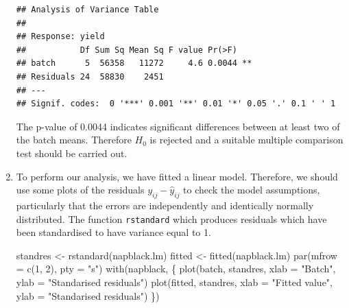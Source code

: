\documentclass[
]{book}
\newenvironment{Shaded}{\begin{snugshade}}{\end{snugshade}}
\newcommand{\AttributeTok}[1]{\textcolor[rgb]{0.77,0.63,0.00}{#1}}
\newcommand{\DecValTok}[1]{\textcolor[rgb]{0.00,0.00,0.81}{#1}}
\newcommand{\FunctionTok}[1]{\textcolor[rgb]{0.00,0.00,0.00}{#1}}
\newcommand{\NormalTok}[1]{#1}
\newcommand{\OtherTok}[1]{\textcolor[rgb]{0.56,0.35,0.01}{#1}}
\newcommand{\SpecialCharTok}[1]{\textcolor[rgb]{0.00,0.00,0.00}{#1}}
\newcommand{\StringTok}[1]{\textcolor[rgb]{0.31,0.60,0.02}{#1}}
\theoremstyle{definition}
\theoremstyle{definition}
\theoremstyle{definition}
\theoremstyle{definition}
\theoremstyle{remark}
\begin{document}
\begin{enumerate}
\begin{Shaded}
\end{Shaded}

\begin{verbatim}
## Analysis of Variance Table
## 
## Response: yield
##           Df Sum Sq Mean Sq F value Pr(>F)   
## batch      5  56358   11272     4.6 0.0044 **
## Residuals 24  58830    2451                  
## ---
## Signif. codes:  0 '***' 0.001 '**' 0.01 '*' 0.05 '.' 0.1 ' ' 1
\end{verbatim}

  The p-value of 0.0044 indicates significant differences between at least two of the batch
  means. Therefore \(H_0\) is rejected and a suitable multiple comparison test should be carried
  out.
\item
  To perform our analysis, we have fitted a linear model. Therefore, we should use some plots of the residuals \(y_{ij} - \hat{y}_{ij}\) to check the model assumptions, particularly that the errors are independently and identically normally distributed. The function \texttt{rstandard} which produces residuals which have been standardised to have variance equal to 1.

\begin{Shaded}
\begin{Highlighting}[]
\NormalTok{standres }\OtherTok{\textless{}{-}} \FunctionTok{rstandard}\NormalTok{(napblack.lm)}
\NormalTok{fitted }\OtherTok{\textless{}{-}} \FunctionTok{fitted}\NormalTok{(napblack.lm)}
\FunctionTok{par}\NormalTok{(}\AttributeTok{mfrow =} \FunctionTok{c}\NormalTok{(}\DecValTok{1}\NormalTok{, }\DecValTok{2}\NormalTok{), }\AttributeTok{pty =} \StringTok{"s"}\NormalTok{)}
\FunctionTok{with}\NormalTok{(napblack, \{}
  \FunctionTok{plot}\NormalTok{(batch, standres, }\AttributeTok{xlab =} \StringTok{"Batch"}\NormalTok{, }\AttributeTok{ylab =} \StringTok{"Standarised residuals"}\NormalTok{)}
  \FunctionTok{plot}\NormalTok{(fitted, standres, }\AttributeTok{xlab =} \StringTok{"Fitted value"}\NormalTok{, }\AttributeTok{ylab =} \StringTok{"Standarised residuals"}\NormalTok{)}
\NormalTok{\})}
\end{Highlighting}
\end{Shaded}


\end{enumerate}
\end{document}
